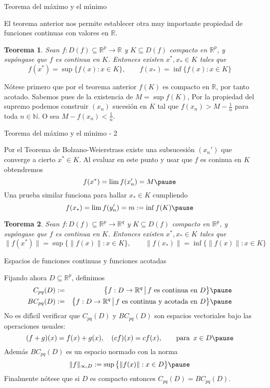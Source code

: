 \documentclass[xcolor=dvipsnames,10pt,handout, draft]{beamer}
\newcommand{\rz}{\mathbb R}
\newcommand{\rzp}{\mathbb R^{p}}
\newcommand{\rzq}{\mathbb R^{q}}
\newtheorem*{teo}{Teorema}
\begin{document}
\begin{frame}{Teorema del m\'aximo y el m\'\i nimo}

El teorema anterior nos permite establecer otra muy importante propiedad de funciones continuas con valores en $\rz$.\pause

\begin{teo}
Sean $f:D(f)\subseteq\rzp\to\rz$ y $K\subseteq D(f)$ compacto en $\rzp$, y sup\'ongase que $f$ es continua en $K$. Entonces existen $x^*,x_*\in K$ tales que 
$$f(x^*)=\sup\big\{f(x):x\in K\big\},\qquad f(x_*)=\inf\big\{f(x):x\in K\big\}$$
\end{teo}\pause
N\'otese primero que por el teorema anterior $f(K)$ es compacto en $\rz$, por tanto acotado.
\vskip4pt\pause
Sabemos pues de la existencia de $M=\sup f(K)$, \pause\vskip4pt Por la propiedad del supremo podemos construir $(x_n)$ sucesi\'on en $K$ tal que $\displaystyle f(x_n)>M-\frac{1}{n}$ para toda $n\in\mathbb N$. \pause O sea $\displaystyle M-f(x_n)<\frac{1}{n}$.

\end{frame}



\begin{frame}{Teorema del m\'aximo y el m\'\i nimo - 2}

Por el Teorema de Bolzano-Weierstrass existe una subsucesi\'on $(x_n')$ que converge a cierto $x^*\in K$.
\vskip4pt\pause
Al evaluar en este punto y usar que $f$ es coninua en $K$ obtendremos
$$f(x^*)=\lim f(x_n')=M\pause$$
Una prueba similar funciona para hallar $x_*\in K$ cumpliendo 
$$f(x_*)=\lim f(y_n')=m:=\inf f(K)\pause$$
\begin{teo}
\pause Sean $f:D(f)\subseteq\rzp\to\rzq$ y $K\subseteq D(f)$ compacto en $\rzp$, y sup\'ongase que $f$ es continua en $K$. Entonces existen $x^*,x_*\in K$ tales que 
$$\|f(x^*)\|=\sup\big\{\|f(x)\|:x\in K\big\},\qquad \|f(x_*)\|=\inf\big\{\|f(x)\|:x\in K\big\}$$
\end{teo}

\end{frame}



\begin{frame}{Espacios de funciones continuas y funciones acotadas}\pause

Fijando ahora $D\subseteq\rzp$, definimos
\begin{eqnarray*}
C_{pq}(D)&:=&\big\{f:D\to\rzq\,\big|\,f\text{ es continua en }D\big\}\pause\\
BC_{pq}(D)&:=&\big\{f:D\to\rzq\,\big|\,f\text{ es continua y acotada en }D\big\}\pause
\end{eqnarray*}
No es dif\'\i cil verificar que $C_{pq}(D)$ y $BC_{pq}(D)$ son espacios vectoriales bajo las operaciones usuales:
$$(f+g)(x)=f(x)+g(x),\quad (cf)(x)=cf(x),\qquad\text{para }\,x\in D\pause$$
Adem\'as $BC_{pq}(D)$ es un espacio normado con la norma
$$\|f\|_{\infty,D}:=\sup\big\{\|f(x)\|:x\in D\big\}\pause$$
Finalmente n\'otese que si $D$ es compacto entonces $C_{pq}(D)=BC_{pq}(D)$.
\end{frame}
\end{document}
